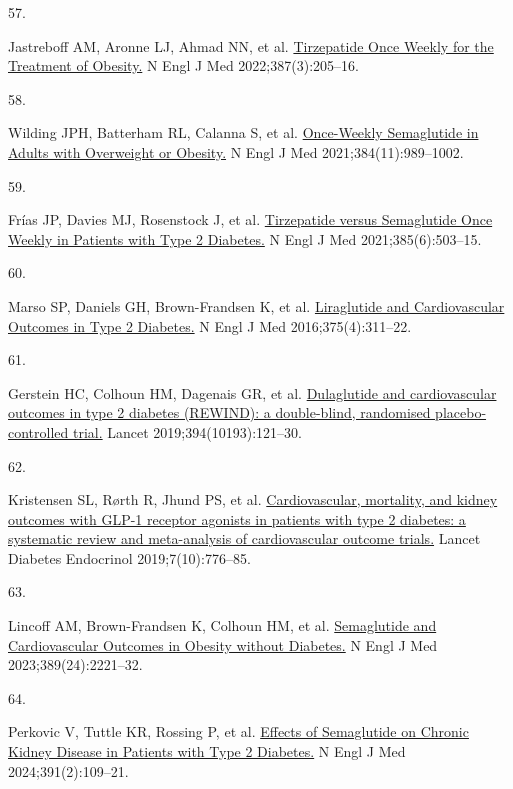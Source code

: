\documentclass[
  11pt,
]{article}
\newlength{\cslhangindent}
\newlength{\csllabelwidth}
\newenvironment{CSLReferences}[2] %
 {\begin{list}{}{%
  \setlength{\itemindent}{0pt}
  \setlength{\leftmargin}{0pt}
  \setlength{\parsep}{0pt}
  \ifodd #1
   \setlength{\leftmargin}{\cslhangindent}
   \setlength{\itemindent}{-1\cslhangindent}
  \fi
  \setlength{\itemsep}{#2\baselineskip}}}
 {\end{list}}
\newcommand{\CSLLeftMargin}[1]{\parbox[t]{\csllabelwidth}{\strut#1\strut}}
\newcommand{\CSLRightInline}[1]{\parbox[t]{\linewidth - \csllabelwidth}{\strut#1\strut}}
\begin{document}
\begin{CSLReferences}{0}{1}
\CSLLeftMargin{57. }%
\CSLRightInline{Jastreboff AM, Aronne LJ, Ahmad NN, et al.
\href{https://doi.org/10.1056/NEJMoa2206038}{{Tirzepatide Once Weekly
for the Treatment of Obesity.}} N Engl J Med 2022;387(3):205--16. }

\CSLLeftMargin{58. }%
\CSLRightInline{Wilding JPH, Batterham RL, Calanna S, et al.
\href{https://doi.org/10.1056/NEJMoa2032183}{{Once-Weekly Semaglutide in
Adults with Overweight or Obesity.}} N Engl J Med
2021;384(11):989--1002. }

\CSLLeftMargin{59. }%
\CSLRightInline{Frías JP, Davies MJ, Rosenstock J, et al.
\href{https://doi.org/10.1056/NEJMoa2107519}{{Tirzepatide versus
Semaglutide Once Weekly in Patients with Type 2 Diabetes.}} N Engl J Med
2021;385(6):503--15. }

\CSLLeftMargin{60. }%
\CSLRightInline{Marso SP, Daniels GH, Brown-Frandsen K, et al.
\href{https://doi.org/10.1056/NEJMoa1603827}{{Liraglutide and
Cardiovascular Outcomes in Type 2 Diabetes.}} N Engl J Med
2016;375(4):311--22. }

\CSLLeftMargin{61. }%
\CSLRightInline{Gerstein HC, Colhoun HM, Dagenais GR, et al.
\href{https://doi.org/10.1016/S0140-6736(19)31149-3}{{Dulaglutide and
cardiovascular outcomes in type 2 diabetes (REWIND): a double-blind,
randomised placebo-controlled trial.}} Lancet 2019;394(10193):121--30. }

\CSLLeftMargin{62. }%
\CSLRightInline{Kristensen SL, Rørth R, Jhund PS, et al.
\href{https://doi.org/10.1016/S2213-8587(19)30249-9}{{Cardiovascular,
mortality, and kidney outcomes with GLP-1 receptor agonists in patients
with type 2 diabetes: a systematic review and meta-analysis of
cardiovascular outcome trials.}} Lancet Diabetes Endocrinol
2019;7(10):776--85. }

\CSLLeftMargin{63. }%
\CSLRightInline{Lincoff AM, Brown-Frandsen K, Colhoun HM, et al.
\href{https://doi.org/10.1056/NEJMoa2307563}{{Semaglutide and
Cardiovascular Outcomes in Obesity without Diabetes.}} N Engl J Med
2023;389(24):2221--32. }

\CSLLeftMargin{64. }%
\CSLRightInline{Perkovic V, Tuttle KR, Rossing P, et al.
\href{https://doi.org/10.1056/NEJMoa2403347}{{Effects of Semaglutide on
Chronic Kidney Disease in Patients with Type 2 Diabetes.}} N Engl J Med
2024;391(2):109--21. }


\end{CSLReferences}
\end{document}

